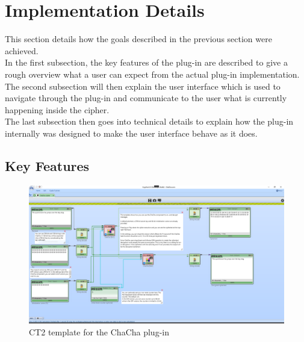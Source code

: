 \section{Implementation Details}
\label{sec:implementationDetails}

This section details how the goals described in the previous section were achieved. \\
In the first subsection, the key features of the plug-in are described to give a rough overview what a user can expect from the actual plug-in implementation. \\
The second subsection will then explain the user interface which is used to navigate through the plug-in and communicate to the user what is currently happening inside the cipher. \\
The last subsection then goes into technical details to explain how the plug-in internally was designed to make the user interface behave as it does.


\subsection{Key Features}
\label{sec:keyFeatures}

\begin{figure}
\centering
\includegraphics[width=\textwidth]{figures/ct2/plugin-template.png}
\caption[ChaCha CT2 template]{CT2 template for the ChaCha plug-in}
\label{fig:plugin.template}
\end{figure}

